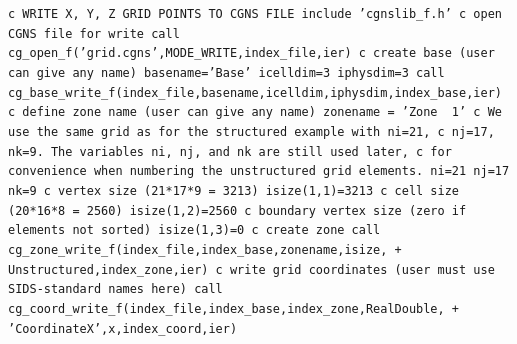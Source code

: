 \documentclass[12pt]{article}
\begin{document}
{\tt \noindent c  WRITE X, Y, Z GRID POINTS TO CGNS FILE
\newline\indent      include 'cgnslib\_f.h'
\newline c  open CGNS file for write
\newline\indent      call cg\_open\_f('grid.cgns',MODE\_WRITE,index\_file,ier)
\newline c  create base (user can give any name)
\newline\indent      basename='Base'
\newline\indent      icelldim=3
\newline\indent      iphysdim=3
\newline\indent      call cg\_base\_write\_f(index\_file,basename,icelldim,iphysdim,index\_base,ier)
\newline c  define zone name (user can give any name)
\newline\indent      zonename = 'Zone~~1'
\newline c  We use the same grid as for the structured example with ni=21,
\newline c  nj=17, nk=9.  The variables ni, nj, and nk are still used later,
\newline c  for convenience when numbering the unstructured grid elements.
\newline\indent      ni=21
\newline\indent      nj=17
\newline\indent      nk=9
\newline c  vertex size (21*17*9 = 3213)
\newline\indent      isize(1,1)=3213
\newline c  cell size (20*16*8 = 2560)
\newline\indent      isize(1,2)=2560
\newline c  boundary vertex size (zero if elements not sorted)
\newline\indent      isize(1,3)=0
\newline c  create zone
\newline\indent      call cg\_zone\_write\_f(index\_file,index\_base,zonename,isize,
\newline + \indent Unstructured,index\_zone,ier)
\newline c  write grid coordinates (user must use SIDS-standard names here)
\newline\indent      call cg\_coord\_write\_f(index\_file,index\_base,index\_zone,RealDouble,
\newline + \indent 'CoordinateX',x,index\_coord,ier)
}
\end{document}

